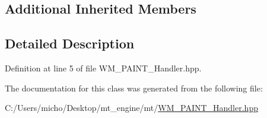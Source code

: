 \subsection*{Additional Inherited Members}


\subsection{Detailed Description}


Definition at line 5 of file W\+M\+\_\+\+P\+A\+I\+N\+T\+\_\+\+Handler.\+hpp.



The documentation for this class was generated from the following file\+:\begin{DoxyCompactItemize}
\item 
C\+:/\+Users/micho/\+Desktop/mt\+\_\+engine/mt/\hyperlink{_w_m___p_a_i_n_t___handler_8hpp}{W\+M\+\_\+\+P\+A\+I\+N\+T\+\_\+\+Handler.\+hpp}\end{DoxyCompactItemize}
